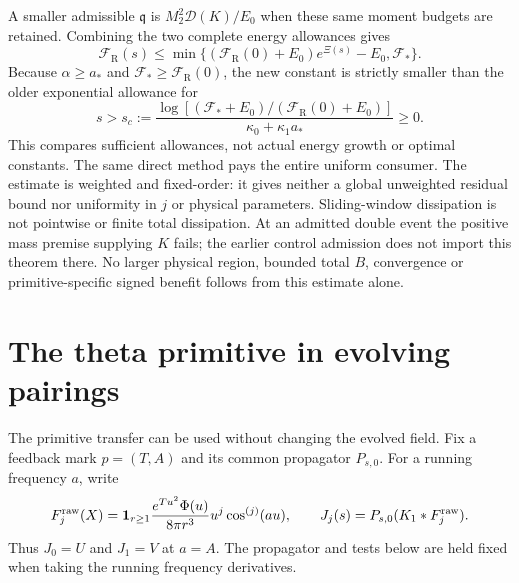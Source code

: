 \documentclass[11pt]{article}
\numberwithin{equation}{section}
\begin{document}
A smaller admissible $\mathfrak q$ is
$M_2^2\mathcal D(K)/E_0$ when these same moment budgets are retained.
Combining the two complete energy allowances gives
\begin{equation}\label{eq:residualminimumallowance}
 \mathcal F_{\mathrm R}(s)\le
 \min\{(\mathcal F_{\mathrm R}(0)+E_0)e^{\Xi(s)}-E_0,\mathcal F_*\}.
\end{equation}
Because $\alpha\ge a_*$ and $\mathcal F_*\ge\mathcal F_{\mathrm R}(0)$,
the new constant is strictly smaller than the older exponential
allowance for
\begin{equation}\label{eq:residualuniformcrossing}
 s>s_c:=\frac{\log[(\mathcal F_*+E_0)/
                         (\mathcal F_{\mathrm R}(0)+E_0)]}
                    {\kappa_0+\kappa_1a_*}\ge0.
\end{equation}
This compares sufficient allowances, not actual energy growth or optimal
constants. The same direct method pays the entire uniform consumer.
The estimate is weighted and fixed-order: it gives neither a global
unweighted residual bound nor uniformity in $j$ or physical parameters.
Sliding-window dissipation is not pointwise or finite total dissipation.
At an admitted double event the positive mass premise supplying $K$
fails; the earlier control admission does not import this theorem there.
No larger physical region, bounded total $B$, convergence or
primitive-specific signed benefit follows from this estimate alone.

\section{The theta primitive in evolving pairings}
\label{sec:primitiveduality}

The primitive transfer can be used without changing the evolved field.
Fix a feedback mark $p=(T,A)$ and its common propagator $P_{s,0}$.
For a running frequency $a$, write
\[
 F_j^{\rm raw}(X)=\mathbf1_{r\ge1}
  \frac{e^{Tu^2}\Phi(u)}{8\pi r^3}u^j\cos^{(j)}(au),\qquad
 J_j(s)=P_{s,0}(K_1*F_j^{\rm raw}).
\]
Thus $J_0=U$ and $J_1=V$ at $a=A$. The propagator and tests below
are held fixed when taking the running frequency derivatives.
\end{document}
